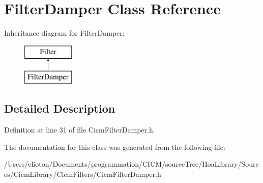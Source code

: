 \hypertarget{class_filter_damper}{\section{Filter\-Damper Class Reference}
\label{class_filter_damper}
}
Inheritance diagram for Filter\-Damper\-:\begin{figure}[H]
\begin{center}
\leavevmode
\includegraphics[height=2.000000cm]{class_filter_damper}
\end{center}
\end{figure}


\subsection{Detailed Description}


Definition at line 31 of file Cicm\-Filter\-Damper.\-h.



The documentation for this class was generated from the following file\-:\begin{DoxyCompactItemize}
\item 
/\-Users/elioton/\-Documents/programmation/\-C\-I\-C\-M/source\-Tree/\-Hoa\-Library/\-Sources/\-Cicm\-Library/\-Cicm\-Filters/Cicm\-Filter\-Damper.\-h\end{DoxyCompactItemize}
